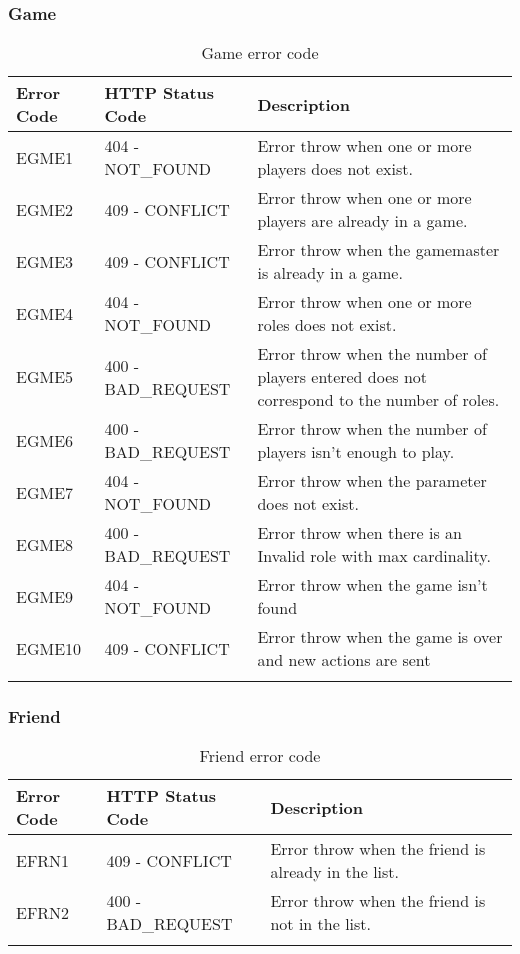 \subsubsection{Game}
\begin{longtable}{|p{}|p{} |p{}|} 
    \hline
    \textbf{Error Code} & \textbf{HTTP Status Code} & \textbf{Description} \\\hline
    EGME1 & 404 - NOT\_FOUND & Error throw when one or more players does not exist.\\\hline
    EGME2 & 409 - CONFLICT & Error throw when one or more players are already in a game.\\\hline
    EGME3 & 409 - CONFLICT & Error throw when the gamemaster is already in a game.\\\hline
    EGME4 & 404 - NOT\_FOUND & Error throw when one or more roles does not exist.\\\hline
    EGME5 & 400 - BAD\_REQUEST & Error throw when the number of players entered does not correspond to the number of roles.\\\hline
    EGME6 & 400 - BAD\_REQUEST & Error throw when the number of players isn't enough to play.\\\hline
    EGME7 & 404 - NOT\_FOUND & Error throw when the parameter does not exist.\\\hline
    EGME8 & 400 - BAD\_REQUEST & Error throw when there is an Invalid role with max cardinality.\\\hline
    EGME9 & 404 - NOT\_FOUND & Error throw when the game isn't found\\\hline
    EGME10 & 409 - CONFLICT & Error throw when the game is over and new actions are sent\\\hline
    \caption{Game error code}
    \label{tab:game_error_code}
\end{longtable}
\subsubsection{Friend}
\begin{longtable}{|p{}|p{} |p{}|} 
    \hline
    \textbf{Error Code} & \textbf{HTTP Status Code} & \textbf{Description} \\\hline
    EFRN1 & 409 - CONFLICT & Error throw when the friend is already in the list.\\\hline
    EFRN2 & 400 - BAD\_REQUEST & Error throw when the friend is not in the list.\\\hline
    \caption{Friend error code}
    \label{tab:friend_error_code}
\end{longtable}
